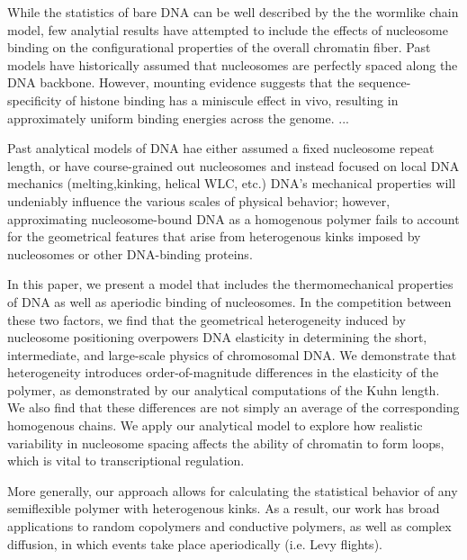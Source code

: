 \documentclass[%
 reprint,
superscriptaddress,
showpacs,preprintnumbers,
 amsmath,amssymb,
 aps,
 prl,
]{revtex4-1}
\begin{document}

While the statistics of bare DNA can be well described by the the wormlike chain
model, few analytial results have attempted to include the effects of nucleosome
binding on the configurational properties of the overall chromatin fiber. 
Past models have historically assumed that nucleosomes are perfectly spaced
along the DNA backbone. However, mounting evidence suggests that the
sequence-specificity of histone binding has a miniscule effect in vivo,
resulting in approximately uniform binding energies across the genome. 
...

Past analytical models of DNA hae either assumed a fixed nucleosome repeat
length, or have course-grained out nucleosomes and instead focused on local DNA mechanics (melting,kinking, helical WLC, etc.) DNA's mechanical properties will undeniably influence the various scales of physical behavior; however, approximating  nucleosome-bound DNA as a homogenous polymer fails to account for the geometrical features that arise from heterogenous kinks imposed by nucleosomes or other DNA-binding proteins.

In this paper, we present a model that includes the thermomechanical
properties of DNA as well as aperiodic binding of nucleosomes. In the
competition between these two factors, we find that the geometrical
heterogeneity induced by nucleosome positioning overpowers DNA elasticity in
determining the short, intermediate, and
large-scale physics of chromosomal DNA. We demonstrate that heterogeneity introduces order-of-magnitude differences in
the elasticity of the polymer, as demonstrated by our analytical computations of
the Kuhn length. We also find that these differences are not
simply an average of the corresponding homogenous chains. We apply our analytical model to
explore how realistic variability in nucleosome spacing affects the ability of chromatin to form
loops, which is vital to transcriptional regulation.

More generally, our approach allows for calculating the statistical behavior of
any semiflexible polymer with heterogenous kinks. As a result, our work has broad
applications to random copolymers and conductive polymers, as well as complex
diffusion, in which events take place aperiodically (i.e. Levy flights).
\end{document}
